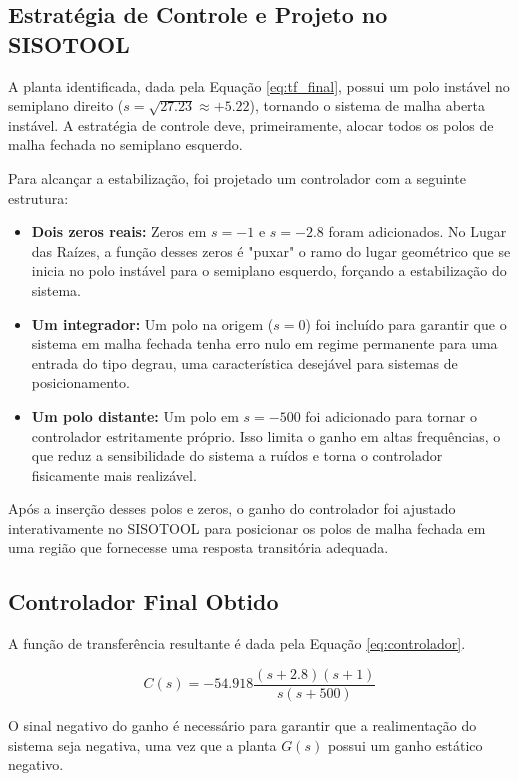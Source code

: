 \subsection{Estratégia de Controle e Projeto no SISOTOOL}

A planta identificada, dada pela Equação \ref{eq:tf_final}, possui um polo instável no semiplano direito ($s = \sqrt{27.23} \approx +5.22$), tornando o sistema de malha aberta instável. A estratégia de controle deve, primeiramente, alocar todos os polos de malha fechada no semiplano esquerdo.

Para alcançar a estabilização, foi projetado um controlador com a seguinte estrutura:
\begin{itemize}
    \item \textbf{Dois zeros reais:} Zeros em $s = -1$ e $s = -2.8$ foram adicionados. No Lugar das Raízes, a função desses zeros é "puxar" o ramo do lugar geométrico que se inicia no polo instável para o semiplano esquerdo, forçando a estabilização do sistema.
    \item \textbf{Um integrador:} Um polo na origem ($s=0$) foi incluído para garantir que o sistema em malha fechada tenha erro nulo em regime permanente para uma entrada do tipo degrau, uma característica desejável para sistemas de posicionamento.
    \item \textbf{Um polo distante:} Um polo em $s = -500$ foi adicionado para tornar o controlador estritamente próprio. Isso limita o ganho em altas frequências, o que reduz a sensibilidade do sistema a ruídos e torna o controlador fisicamente mais realizável.
\end{itemize}

Após a inserção desses polos e zeros, o ganho do controlador foi ajustado interativamente no SISOTOOL para posicionar os polos de malha fechada em uma região que fornecesse uma resposta transitória adequada.

\subsection{Controlador Final Obtido}

A função de transferência resultante é dada pela Equação \ref{eq:controlador}.

\begin{equation}
    C(s) = -54.918 \frac{(s+2.8)(s+1)}{s(s+500)}
    \label{eq:controlador}
\end{equation}

O sinal negativo do ganho é necessário para garantir que a realimentação do sistema seja negativa, uma vez que a planta $G(s)$ possui um ganho estático negativo.


